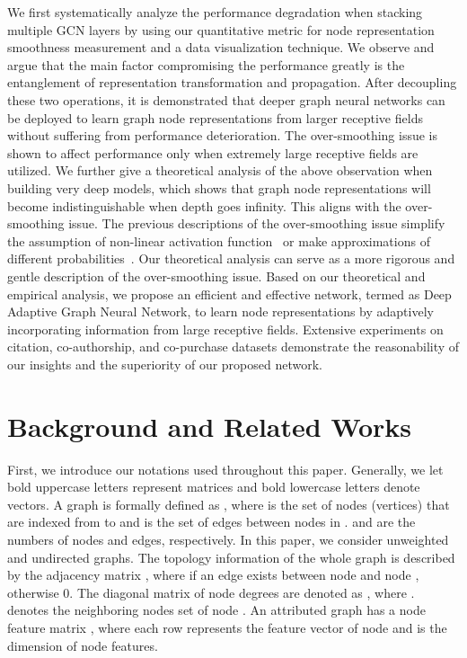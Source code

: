\documentclass[sigconf]{acmart}
\begin{document}
We first systematically analyze the performance
degradation when stacking multiple GCN layers by using our
quantitative metric for node representation smoothness
measurement and a data visualization technique. We observe and
argue that the main factor compromising the performance greatly
is the entanglement of representation transformation and propagation.
After decoupling these two operations, it is demonstrated that
deeper graph neural networks can be deployed to learn graph node
representations from larger receptive fields without suffering
from performance deterioration. The over-smoothing issue is shown
to affect performance only when extremely large receptive fields
are utilized. We further give a theoretical analysis of the above
observation when building very deep models, which shows that
graph node representations will become indistinguishable when
depth goes infinity. This aligns with the over-smoothing issue.
The previous descriptions of the over-smoothing issue simplify
the assumption of non-linear activation function~\cite{li2018deeper,xu2018representation} or make approximations
of different probabilities~\cite{xu2018representation}. Our
theoretical analysis can serve as a more rigorous and gentle
description of the over-smoothing issue. Based on our theoretical
and empirical analysis, we propose an efficient and effective network, termed as Deep Adaptive Graph Neural Network, to learn node
representations by adaptively incorporating information from large receptive fields. Extensive experiments on citation,
co-authorship, and co-purchase datasets demonstrate the
reasonability of our insights and the superiority of our proposed network.


\section{Background and Related Works}

First, we introduce our notations used throughout this paper.
Generally, we let bold uppercase letters represent matrices and
bold lowercase letters denote vectors. A graph is formally
defined as , where  is the set
of nodes (vertices) that are indexed from  to  and  is the set of edges between nodes in .  and  are the numbers
of nodes and edges, respectively. In this paper, we consider unweighted and undirected graphs. The topology information of
the whole graph is described by the adjacency matrix
, where
 if an edge exists between node  and node , otherwise 0. The diagonal
matrix of node degrees are denoted as , where .  denotes the neighboring
nodes set of node . An attributed graph has a node feature
matrix , where each
row  represents the feature
vector of node  and  is the dimension of node features.
\end{document}
